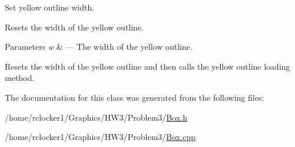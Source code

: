 Set yellow outline width. 

Resets the width of the yellow outline.


\begin{DoxyParams}{Parameters}
{\em w} & --- The width of the yellow outline.\\
\hline
\end{DoxyParams}
Resets the width of the yellow outline and then calls the yellow outline loading method. 

The documentation for this class was generated from the following files\+:\begin{DoxyCompactItemize}
\item 
/home/rclocker1/\+Graphics/\+H\+W3/\+Problem3/\hyperlink{_box_8h}{Box.\+h}\item 
/home/rclocker1/\+Graphics/\+H\+W3/\+Problem3/\hyperlink{_box_8cpp}{Box.\+cpp}\end{DoxyCompactItemize}
